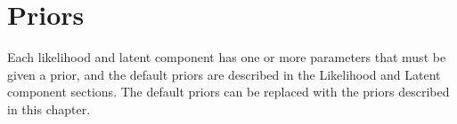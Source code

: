 \chapter{Priors}
Each likelihood and latent component has one or more parameters that must
be given a prior, and the default priors are described in the Likelihood and
Latent component sections. The default priors can be replaced with the priors
described in this chapter.

\localtableofcontents
